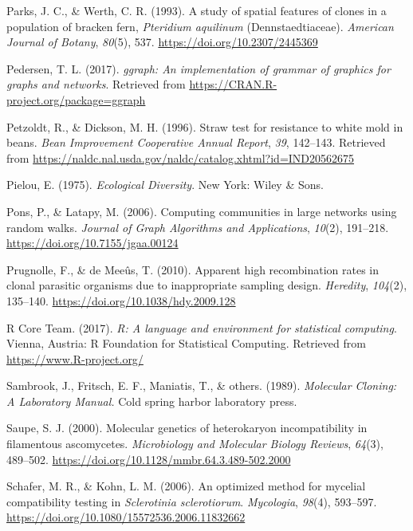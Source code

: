 \documentclass[fleqn,10pt,lineno]{wlpeerj} %
\theoremstyle{definition}
\theoremstyle{definition}
\theoremstyle{definition}
\theoremstyle{remark}
\begin{document}
\hypertarget{ref-parks1993study}{}
Parks, J. C., \& Werth, C. R. (1993). A study of spatial features of
clones in a population of bracken fern, \emph{Pteridium aquilinum}
(Dennstaedtiaceae). \emph{American Journal of Botany}, \emph{80}(5),
537. \url{https://doi.org/10.2307/2445369}

\hypertarget{ref-ggraph}{}
Pedersen, T. L. (2017). \emph{ggraph: An implementation of grammar of
graphics for graphs and networks}. Retrieved from
\url{https://CRAN.R-project.org/package=ggraph}

\hypertarget{ref-petzoldt1996straw}{}
Petzoldt, R., \& Dickson, M. H. (1996). Straw test for resistance to
white mold in beans. \emph{Bean Improvement Cooperative Annual Report},
\emph{39}, 142--143. Retrieved from
\url{https://naldc.nal.usda.gov/naldc/catalog.xhtml?id=IND20562675}

\hypertarget{ref-pielou1975ecological}{}
Pielou, E. (1975). \emph{Ecological Diversity}. New York: Wiley \& Sons.

\hypertarget{ref-pons2006computing}{}
Pons, P., \& Latapy, M. (2006). Computing communities in large networks
using random walks. \emph{Journal of Graph Algorithms and Applications},
\emph{10}(2), 191--218. \url{https://doi.org/10.7155/jgaa.00124}

\hypertarget{ref-prugnolle2010apparent}{}
Prugnolle, F., \& de Meeûs, T. (2010). Apparent high recombination rates
in clonal parasitic organisms due to inappropriate sampling design.
\emph{Heredity}, \emph{104}(2), 135--140.
\url{https://doi.org/10.1038/hdy.2009.128}

\hypertarget{ref-R}{}
R Core Team. (2017). \emph{R: A language and environment for statistical
computing}. Vienna, Austria: R Foundation for Statistical Computing.
Retrieved from \url{https://www.R-project.org/}

\hypertarget{ref-sambrook1989molecular}{}
Sambrook, J., Fritsch, E. F., Maniatis, T., \& others. (1989).
\emph{Molecular Cloning: A Laboratory Manual.} Cold spring harbor
laboratory press.

\hypertarget{ref-saupe2000molecular}{}
Saupe, S. J. (2000). Molecular genetics of heterokaryon incompatibility
in filamentous ascomycetes. \emph{Microbiology and Molecular Biology
Reviews}, \emph{64}(3), 489--502.
\url{https://doi.org/10.1128/mmbr.64.3.489-502.2000}

\hypertarget{ref-schafer2006optimized}{}
Schafer, M. R., \& Kohn, L. M. (2006). An optimized method for mycelial
compatibility testing in \emph{Sclerotinia sclerotiorum}.
\emph{Mycologia}, \emph{98}(4), 593--597.
\url{https://doi.org/10.1080/15572536.2006.11832662}
\end{document}
